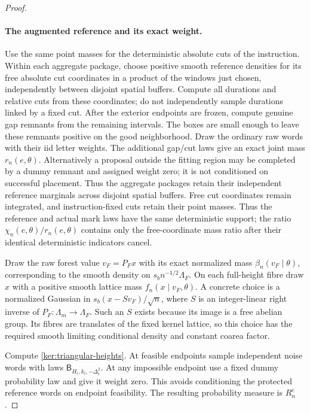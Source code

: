 \begin{proof}
\paragraph{The augmented reference and its exact weight.}
Use the same point masses for the deterministic absolute cuts of the
instruction. Within each aggregate package, choose positive smooth
reference densities for its free absolute cut coordinates in a
product of the windows just chosen, independently between disjoint
spatial buffers. Compute all durations and relative cuts from these
coordinates; do not independently sample durations linked by a fixed
cut. After the exterior endpoints are frozen, compute genuine gap
remnants from the remaining intervals. The boxes are small enough
to leave these remnants positive on the good neighborhood.
Draw the ordinary raw words with their iid letter weights.  The
additional gap/cut laws give an exact joint mass \(r_n(e,\theta)\).
Alternatively a proposal outside the fitting region may be completed
by a dummy remnant and assigned weight zero; it is not conditioned
on successful placement. Thus the aggregate packages retain their
independent reference marginals across disjoint spatial buffers.
Free cut coordinates remain integrated, and instruction-fixed cuts
retain their point masses. Thus the reference and actual mark laws
have the same deterministic support; the ratio
\(\chi_n(e,\theta)/r_n(e,\theta)\) contains only the free-coordinate
mass ratio after their identical deterministic indicators cancel.

Draw the raw forest value \(v_F=P_Fx\) with its exact normalized
mass \(\beta_n(v_F\mid\theta)\), corresponding to the smooth density
on \(s_bn^{-1/2}\Lambda_F\).  On each full-height fibre draw \(x\)
with a positive smooth lattice mass \(f_n(x\mid v_F,\theta)\).
A concrete choice is a normalized Gaussian in
\(s_b(x-Sv_F)/\sqrt n\), where \(S\) is an integer-linear right
inverse of \(P_F:\Lambda_m\to\Lambda_F\).  Such an \(S\) exists
because its image is a free abelian group.  Its fibres are translates
of the fixed kernel lattice, so this choice has the required smooth
limiting conditional density and constant coarea factor.

Compute \eqref{ker:triangular-heights}.  At feasible endpoints sample
independent noise words with laws
\(\mathsf B_{H_i,k_i,-\Delta_i^2}\).  At any impossible endpoint use
a fixed dummy probability law and give it weight zero.  This avoids
conditioning the protected reference words on endpoint feasibility.
The resulting probability measure is \(R_n^e\).


\end{proof}
